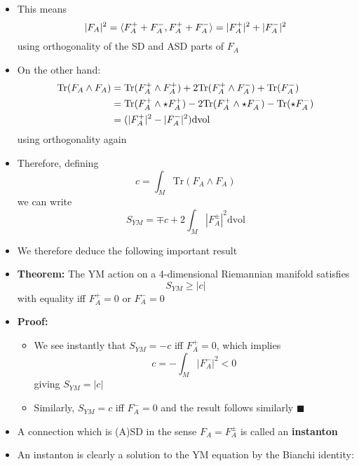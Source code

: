 \documentclass[12pt,a4paper]{article}
\numberwithin{equation}{section}
\begin{document}
\begin{itemize}
		\item This means
		\begin{equation}
			|F_{A}|^{2}=\braket{F_{A}^{+}+F_{A}^{-},F_{A}^{+}+F_{A}^{-}}=|F_{A}^{+}|^{2}+|F_{A}^{-}|^{2}
		\end{equation}
		using orthogonality of the SD and ASD parts of $F_{A}$
		\item On the other hand:
		\newcommand{\fap}{F_{A}^{+}}
		\newcommand{\famm}{F_{A}^{-}}
		\begin{equation}
			\begin{aligned}
				\text{Tr}(F_{A}\wedge F_{A})&=\text{Tr}(F_{A}^{+}\wedge F_{A}^{+})+2\text{Tr}(\fap\wedge\famm)+\text{Tr}(\fam\wedge\famm)\\&=\text{Tr}(\fap\wedge\star\fap)-2\text{Tr}(\fap\wedge\star\famm)-\text{Tr}(\fam\wedge\star\famm)\\&=(|\fap|^{2}-|\famm|^{2})\text{dvol}
			\end{aligned}
		\end{equation}
		using orthogonality again
		\item Therefore, defining
		\begin{equation}
			c=\int_{M}\text{Tr}(F_{A}\wedge F_{A})
		\end{equation}
		we can write 
		\begin{equation}
			S_{YM}=\mp c+2\int_{M}|F_{A}^{\pm}|^{2}\text{dvol}
		\end{equation}
		\item We therefore deduce the following important result
		\item \textbf{Theorem:} The YM action on a 4-dimensional Riemannian manifold satisfies
		\begin{equation}
			S_{YM}\geq |c|
		\end{equation}
		with equality iff $\fap=0$ or $\famm=0$
		\item \textbf{Proof:}
		\begin{itemize}
			\item We see instantly that $S_{YM}=-c$ iff $\fap=0$, which implies 
			$$
			c=-\int_{M}|\famm|^{2}<0
			$$
			giving $S_{YM}=|c|$
			\item Similarly, $S_{YM}=c$ iff $\famm=0$ and the result follows similarly $\blacksquare$
		\end{itemize}
		\item A connection which is (A)SD in the sense $F_{A}=F_{A}^{\pm}$ is called an \textbf{instanton}
		\item An instanton is clearly a solution to the YM equation by the Bianchi identity:

\end{itemize}
\end{document}
